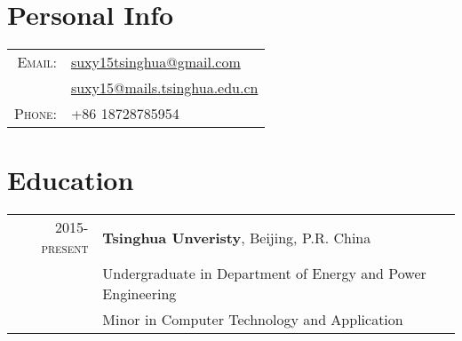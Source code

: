 \documentclass[a4paper,10pt]{article}
\begin{document}
\pagestyle{empty} %

\par{\bigskip\par}

\section{Personal Info}
\begin{tabular}{rl}
    \textsc{Email:}         & \href{mailto:suxy15tsinghua@gmail.com}{suxy15tsinghua@gmail.com} \\
                            & \href{mailto:suxy15@mails.tsinghua.edu.cn}{suxy15@mails.tsinghua.edu.cn} \\
    \textsc{Phone:}         & +86 18728785954 \\
\end{tabular}

\section{Education}
\begin{tabular}{rl}
\textsc{2015-present} & \normalsize\textbf{Tsinghua Unveristy}, Beijing, P.R. China \\
                      & Undergraduate in Department of Energy and Power Engineering \\
                      & Minor in Computer Technology and Application \\
\end{tabular}

\end{document}

